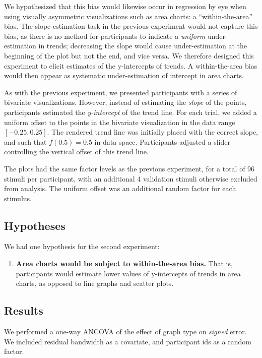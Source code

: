 \documentclass{sigchi}
\begin{document}
We hypothesized that this bias would likewise occur in regression by eye when using visually asymmetric visualizations such as area charts: a ``within-the-area'' bias. The slope estimation task in the previous experiment would not capture this bias, as there is no method for participants to indicate a \emph{uniform} under-estimation in trends; decreasing the slope would cause under-estimation at the beginning of the plot but not the end, and vice versa. We therefore designed this experiment to elicit estimates of the y-intercepts of trends. A within-the-area bias would then appear as systematic under-estimation of intercept in area charts.

As with the previous experiment, we presented participants with a series of bivariate visualizations. However, instead of estimating the \emph{slope} of the points, participants estimated the \emph{y-intercept} of the trend line. For each trial, we added a uniform offset to the points in the bivariate visualization in the data range $[-0.25,0.25]$. The rendered trend line was initially placed with the correct slope, and such that $f(0.5)=0.5$ in data space. Participants adjusted a slider controlling the vertical offset of this trend line.

The plots had the same factor levels as the previous experiment, for a total of 96 stimuli per participant, with an additional 4 validation stimuli otherwise excluded from analysis. The uniform offset was an additional random factor for each stimulus.

\subsection{Hypotheses}

We had one hypothesis for the second experiment:
\begin{enumerate}
	\item \textbf{Area charts would be subject to within-the-area bias.} That is, participants would estimate lower values of y-intercepts of trends in area charts, as opposed to line graphs and scatter plots.
\end{enumerate}

\subsection{Results}
We performed a one-way ANCOVA of the effect of graph type on \emph{signed} error. We included residual bandwidth as a covariate, and participant ids as a random factor.
\end{document}
